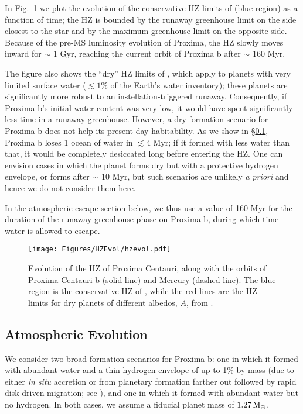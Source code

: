 \documentclass[preprint,12pt]{aastex}
\def\mearth{{\rm\,M_\oplus}}
\begin{document}
In Fig.~\ref{fig:HZEvol} we plot the evolution of the conservative HZ
limits of \cite{Kopparapu13} (blue region) as a function of time; the
HZ is bounded by the runaway greenhouse limit on the side closest to
the star and by the maximum greenhouse limit on the opposite
side. Because of the pre-MS luminosity evolution of
Proxima, the HZ slowly moves inward for $\sim$ 1 Gyr, reaching the
current orbit of Proxima b after $\sim$ 160 Myr.

The figure also shows the ``dry'' HZ limits of \cite{Abe11}, which
apply to planets with very limited surface water ($\lesssim 1\%$ of
the Earth's water inventory); these planets are significantly more
robust to an instellation-triggered runaway. Consequently, if Proxima
b's initial water content was very low, it would have spent
significantly less time in a runaway greenhouse. However, a dry
formation scenario for Proxima b does not help its present-day
habitability. As we show in \S\ref{sec:results:atmesc}, Proxima b
loses 1 ocean of water in $\lesssim 4$ Myr; if it formed with less water
than that, it would be completely desiccated long before entering the
\cite{Abe11} HZ. One can envision cases in which the planet forms dry
but with a protective hydrogen envelope, or forms after $\sim$ 10 Myr,
but such scenarios are unlikely \emph{a priori} and hence we do not consider
them here.

In the atmospheric escape section below, we thus use a value of 160
Myr for the duration of the runaway greenhouse phase on Proxima b,
during which time water is allowed to escape.

\begin{figure}[ht]
\centering
\texttt{[image: Figures/HZEvol/hzevol.pdf]}
\caption{Evolution of the HZ of Proxima Centauri, along with the orbits of Proxima Centauri b (solid line) 
and Mercury (dashed line). The blue region is the conservative HZ of \cite{Kopparapu13}, while the red lines
are the HZ limits for dry planets of different albedos, $A$, from \cite{Abe11}.}
\label{fig:HZEvol}
\end{figure}

\subsection{Atmospheric Evolution}
\label{sec:results:atmesc}

We consider two broad formation scenarios for Proxima b: one in which
it formed with abundant water and a thin hydrogen envelope of up to
1\% by mass (due to either \emph{in situ} accretion or from planetary
formation farther out followed by rapid disk-driven migration; see
\cite{Luger15}), and one in which it formed with abundant water but no
hydrogen. In both cases, we assume a fiducial planet mass of $1.27
\mearth$.
\end{document}
